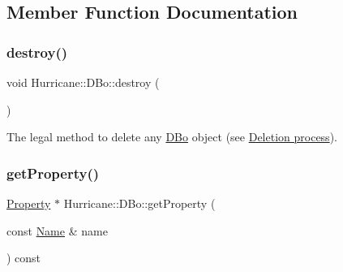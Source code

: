 \subsection{Member Function Documentation}
\mbox{\label{classHurricane_1_1DBo_a67febf5bf9c8b322674648688639728b}} 
\subsubsection{\texorpdfstring{destroy()}{destroy()}}
{\footnotesize\ttfamily void Hurricane\+::\+D\+Bo\+::destroy (\begin{DoxyParamCaption}{ }\end{DoxyParamCaption})\hspace{0.3cm}{\ttfamily [virtual]}}

The legal method to delete any \hyperlink{classHurricane_1_1DBo}{D\+Bo} object (see \hyperlink{classHurricane_1_1DBo_sDBodestroy}{Deletion process}). \mbox{\label{classHurricane_1_1DBo_a599f61978df51d1d4c351f6cbd02488d}} 
\subsubsection{\texorpdfstring{get\+Property()}{getProperty()}}
{\footnotesize\ttfamily \hyperlink{classHurricane_1_1Property}{Property} $\ast$ Hurricane\+::\+D\+Bo\+::get\+Property (\begin{DoxyParamCaption}\item[{const \hyperlink{classHurricane_1_1Name}{Name} \&}]{name }\end{DoxyParamCaption}) const}


